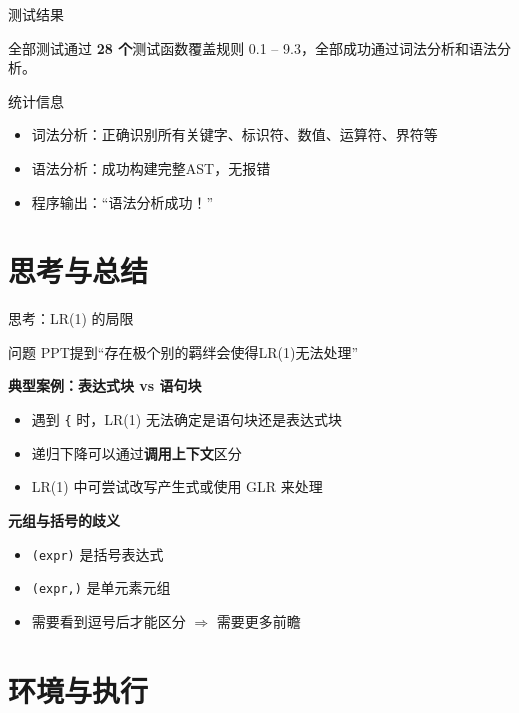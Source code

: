 \documentclass[aspectratio=169]{ctexbeamer}
\begin{document}
\begin{frame}{测试结果}
    \begin{alertblock}{全部测试通过}
        \textbf{28 个}测试函数覆盖规则 0.1 -- 9.3，全部成功通过词法分析和语法分析。
    \end{alertblock}
    \vfill
    \begin{block}{统计信息}
        \begin{itemize}
            \item 词法分析：正确识别所有关键字、标识符、数值、运算符、界符等
            \item 语法分析：成功构建完整AST，无报错
            \item 程序输出：``语法分析成功！''
        \end{itemize}
    \end{block}
\end{frame}

\section{思考与总结}

\begin{frame}{思考：LR(1) 的局限}
    \begin{block}{问题}
        PPT提到``存在极个别的羁绊会使得LR(1)无法处理''
    \end{block}
    \vfill
    \textbf{典型案例：表达式块 vs 语句块}
    \begin{itemize}
        \item 遇到 \texttt{\{} 时，LR(1) 无法确定是语句块还是表达式块
        \item 递归下降可以通过\textbf{调用上下文}区分
        \item LR(1) 中可尝试改写产生式或使用 GLR 来处理
    \end{itemize}
    \vfill
    \textbf{元组与括号的歧义}
    \begin{itemize}
        \item \texttt{(expr)} 是括号表达式
        \item \texttt{(expr,)} 是单元素元组
        \item 需要看到逗号后才能区分 $\Rightarrow$ 需要更多前瞻
    \end{itemize}
\end{frame}

\section{环境与执行}
\end{document}
